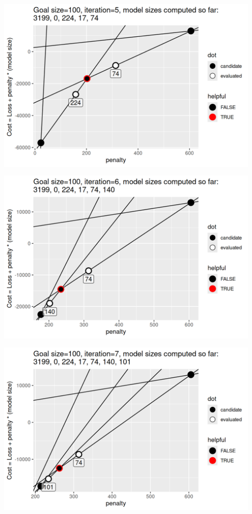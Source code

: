 \begin{frame}
  \includegraphics[width=\textwidth]{figure-sequential-search-5.png}
\end{frame}
 
\begin{frame}
  \includegraphics[width=\textwidth]{figure-sequential-search-6.png}
\end{frame}
 
\begin{frame}
  \includegraphics[width=\textwidth]{figure-sequential-search-7.png}
\end{frame}
 
